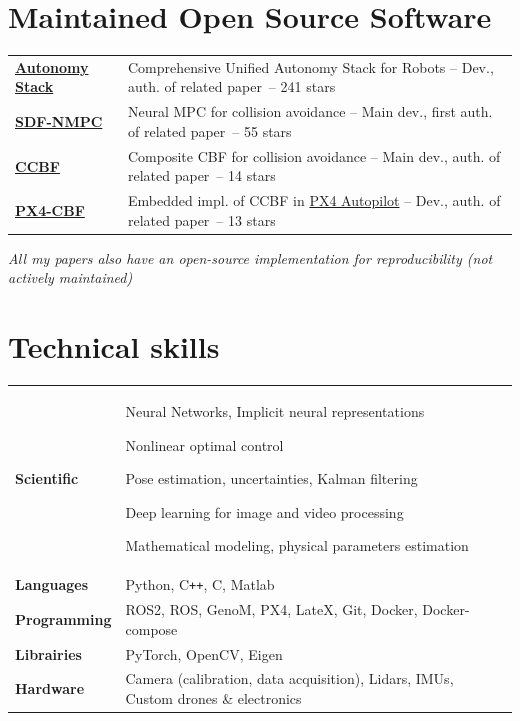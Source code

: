 \documentclass[11pt,a4paper]{article}
\def\Plus{\texttt{+}}
\newlength{\colone}
\newlength{\coltwo}
\newcommand{\stars}[1]{\footnotesize{~-- #1 stars}}
\newcommand{\notes}[1]{{\small\color{gray}\itshape #1}}
\begin{document}
\section{Maintained Open Source Software}
\begin{longtable}{@{}p{\colone}p{\coltwo}@{}}
	{\bfseries \href{https://ntnu-arl.github.io/unified_autonomy_stack/}{Autonomy Stack}}
		& Comprehensive Unified Autonomy Stack for Robots -- {\small Dev., auth. of related paper}\stars{241}
\\
	{\bfseries \href{https://ntnu-arl.github.io/sdf-nmpc/}{SDF-NMPC}}
		& Neural MPC for collision avoidance -- {\small Main dev., first auth. of related paper}\stars{55}
\\
	{\bfseries \href{https://github.com/ntnu-arl/composite_cbf}{CCBF}}
		& Composite CBF for collision avoidance -- {\small Main dev., auth. of related paper}\stars{14}
\\
	{\bfseries \href{https://github.com/ntnu-arl/PX4-CBF}{PX4-CBF}}
		& Embedded impl. of CCBF in \href{https://px4.io/}{PX4 Autopilot} -- {\small Dev., auth. of related paper}\stars{13}
\end{longtable}

\notes{
	All my papers also have an open-source implementation for reproducibility (not actively maintained)
}

\section{Technical skills}
\begin{longtable}{@{}p{\colone}p{\coltwo}@{}}
	\bfseries Scientific
		& Neural Networks, Implicit neural representations \par
		Nonlinear optimal control \par
		Pose estimation, uncertainties, Kalman filtering \par
		Deep learning for image and video processing \par
		Mathematical modeling, physical parameters estimation \\
	\bfseries Languages
		& Python, {C\Plus\Plus}, C, Matlab \\
	\bfseries Programming
		& ROS2, ROS, GenoM, PX4, LateX, Git, Docker, Docker-compose \\
	\bfseries Librairies
		& PyTorch, OpenCV, Eigen \\
	\bfseries Hardware
		& Camera (calibration, data acquisition), Lidars, IMUs, Custom drones \& electronics
\end{longtable}
\end{document}
